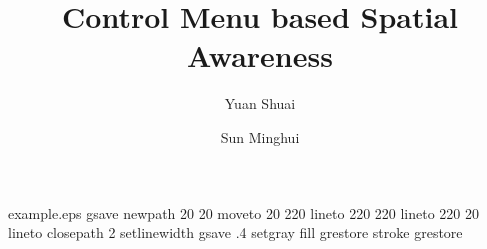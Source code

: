 %
%
%
%
%
\begin{filecontents*}{example.eps}
gsave
newpath
  20 20 moveto
  20 220 lineto
  220 220 lineto
  220 20 lineto
closepath
2 setlinewidth
gsave
  .4 setgray fill
grestore
stroke
grestore
\end{filecontents*}
%
\RequirePackage{fix-cm}
%
\documentclass[smallextended,twocolumn]{svjour3}       %
%
\emergencystretch=\maxdimen
{}

\smartqed  %
%
\usepackage{graphicx}
%
%
%
%
%


\title{Control Menu based Spatial Awareness%
}
\subtitle{}


\author{Yuan Shuai         \and
        Sun Minghui %
}



